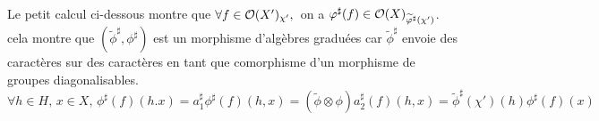 \begin{multicols}{2}
	\begin{center}
	\end{center}

	\columnbreak
	\begin{center}
	\end{center}
\end{multicols}

Le petit calcul ci-dessous montre que $\forall f\in \mathcal{O}(X')_{\chi'},\,$ on a $\varphi^\sharp(f)\in \mathcal{O}(X)_{\widetilde{\varphi}^\sharp(\chi')}$. cela montre que $(\widetilde{\phi}^\sharp,\phi^\sharp)$ est un morphisme d'algèbres graduées car $\widetilde{\phi}^\sharp$ envoie des caractères sur des caractères en tant que comorphisme d'un morphisme de groupes diagonalisables. 
$$\forall h\in H,\,x\in X,\, \phi^\sharp(f)(h.x)=a_1^\sharp\phi^\sharp(f)(h, x)=(\widetilde{\phi}\otimes\phi)a_2^\sharp(f)(h,x)=\widetilde{\phi}^\sharp(\chi')(h)\phi^\sharp(f)(x)$$ 

